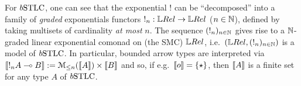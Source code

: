 For $\BSTLC$, one can see that the exponential $!$ can be ``decomposed'' into a family of \emph{graded} exponentials functors $!_n:\LREL\to\LREL$ ($n\in\mathbb{N}$), defined by taking multisets of cardinality \emph{at most} $n$. %
The sequence $(!_n)_{n\in\mathbb{N}}$ gives rise to a $\mathbb{N}$-graded linear exponential comonad on (the SMC) $\LREL$, %
i.e.\ $(\LREL,(!_n)_{n\in\N})$ is a model of $\BSTLC$. 
In particular, bounded arrow types are interpreted via $\llbracket!_{n}A\multimap B\rrbracket:= \mathcal{M}_{\leq n}(\llbracket A\rrbracket) \times \llbracket B\rrbracket$ and so, 
if e.g.\ $\llbracket o\rrbracket=\{\star\}$, then $\llbracket A\rrbracket$ is a finite set for any type $A$ of $\BSTLC$.



